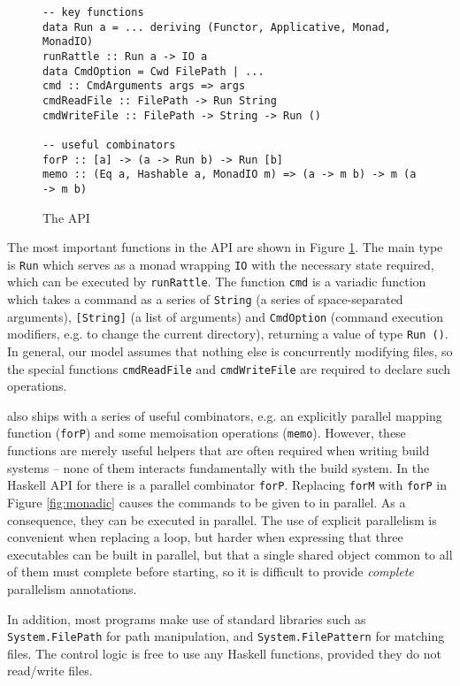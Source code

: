 \begin{figure}
\begin{verbatim}
-- key functions
data Run a = ... deriving (Functor, Applicative, Monad, MonadIO)
runRattle :: Run a -> IO a
data CmdOption = Cwd FilePath | ...
cmd :: CmdArguments args => args
cmdReadFile :: FilePath -> Run String
cmdWriteFile :: FilePath -> String -> Run ()

-- useful combinators
forP :: [a] -> (a -> Run b) -> Run [b]
memo :: (Eq a, Hashable a, MonadIO m) => (a -> m b) -> m (a -> m b)
\end{verbatim}
\caption{The \Rattle API}
\label{fig:api}
\end{figure}

The most important functions in the \Rattle API are shown in Figure \ref{fig:api}. The main type is \texttt{Run} which serves as a monad wrapping \texttt{IO} with the necessary state required, which can be executed by \texttt{runRattle}. The function \texttt{cmd} is a variadic function \cite{variadic_functions} which takes a command as a series of \texttt{String} (a series of space-separated arguments), \texttt{[String]} (a list of arguments) and \texttt{CmdOption} (command execution modifiers, e.g. to change the current directory), returning a value of type \texttt{Run ()}. In general, our model assumes that nothing else is concurrently modifying files, so the special functions \texttt{cmdReadFile} and \texttt{cmdWriteFile} are required to declare such operations.

\Rattle also ships with a series of useful combinators, e.g. an explicitly parallel mapping function (\texttt{forP}) and some memoisation operations (\texttt{memo}). However, these functions are merely useful helpers that are often required when writing build systems -- none of them interacts fundamentally with the build system. In the Haskell API for \Rattle there is a parallel combinator \texttt{forP}. Replacing \texttt{forM} with \texttt{forP} in Figure \ref{fig:monadic} causes the commands to be given to \Rattle in parallel. As a consequence, they can be executed in parallel. The use of explicit parallelism is convenient when replacing a loop, but harder when expressing that three executables can be built in parallel, but that a single shared object common to all of them must complete before starting, so it is difficult to provide \emph{complete} parallelism annotations.

In addition, most \Rattle programs make use of standard libraries such as \texttt{System.FilePath} for path manipulation, and \texttt{System.FilePattern} for matching files. The control logic is free to use any Haskell functions, provided they do not read/write files.

